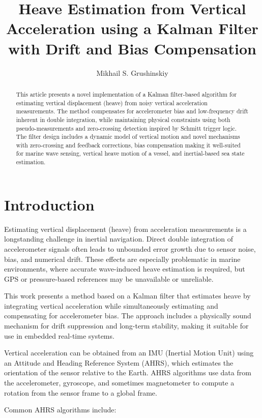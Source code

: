 \documentclass[11pt,letterpaper]{article}
\title{Heave Estimation from Vertical Acceleration using a Kalman Filter with Drift and Bias Compensation}
\author{Mikhail S. Grushinskiy}
\affil{Independent Researcher, 2025}
\begin{document}
\maketitle

\begin{abstract}
This article presents a novel implementation of a Kalman filter-based algorithm for estimating vertical displacement (heave) from noisy vertical acceleration measurements. The method compensates for accelerometer bias and low-frequency drift inherent in double integration, while maintaining physical constraints using both pseudo-measurements and zero-crossing detection inspired by Schmitt trigger logic. The filter design includes a dynamic model of vertical motion and novel mechanisms with zero-crossing and feedback corrections, bias compensation making it well-suited for marine wave sensing, vertical heave motion of a vessel, and inertial-based sea state estimation.
\end{abstract}

\section{Introduction}

Estimating vertical displacement (heave) from acceleration measurements is a longstanding challenge in inertial navigation. Direct double integration of accelerometer signals often leads to unbounded error growth due to sensor noise, bias, and numerical drift. These effects are especially problematic in marine environments, where accurate wave-induced heave estimation is required, but GPS or pressure-based references may be unavailable or unreliable.

This work presents a method based on a Kalman filter that estimates heave by integrating vertical acceleration while simultaneously estimating and compensating for accelerometer bias. The approach includes a physically sound mechanism for drift suppression and long-term stability, making it suitable for use in embedded real-time systems.

Vertical acceleration can be obtained from an IMU (Inertial Motion Unit) using an Attitude and Heading Reference System (AHRS), which estimates the orientation of the sensor relative to the Earth. AHRS algorithms use data from the accelerometer, gyroscope, and sometimes magnetometer to compute a rotation from the sensor frame to a global frame. 

Common AHRS algorithms include:
\end{document}
